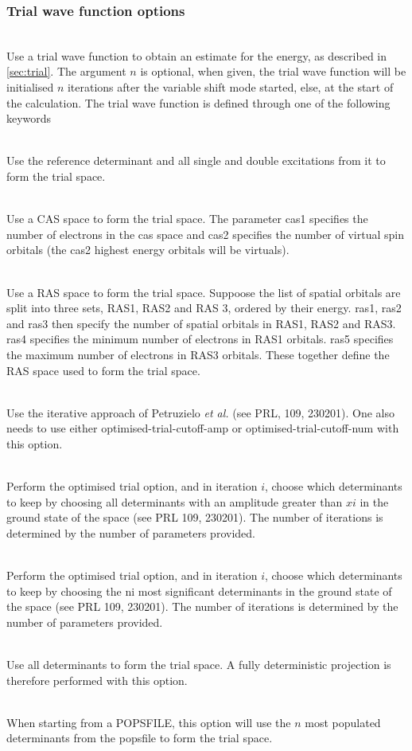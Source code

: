 \documentclass[a4paper,notitlepage]{scrreprt}
\newcommand\codeitem[1]{\needspace{1.5\baselineskip}\item[\textnormal{\ttfamily #1 \nopagebreak}] \hfill \\ \nopagebreak}
\begin{document}
  \subsubsection{Trial wave function options}
  \begin{description}
    \codeitem{trial-wavefunction $n$}
    Use a trial wave function to obtain an estimate for the energy, as
    described in \ref{sec:trial}. The argument $n$ is optional, when given,
    the trial wave function will be initialised $n$ iterations after the
    variable shift mode started, else, at the start of the calculation. The
    trial wave function is defined through one of the following keywords
    \begin{description}
    \codeitem{doubles-trial}
    Use the reference determinant and all single and double excitations
    from it to form the trial space.
    \codeitem{cas-trial cas1 cas2}
    Use a CAS space to form the trial space. The parameter cas1 specifies
    the number of electrons in the cas space and cas2 specifies the
    number of virtual spin orbitals (the cas2 highest energy orbitals
    will be virtuals).
    \codeitem{ras-trial ras1 ras2 ras3 ras4 ras5}
    Use a RAS space to form the trial space. Suppoose the list of spatial
    orbitals are split into three sets, RAS1, RAS2 and RAS 3, ordered
    by their energy. ras1, ras2 and ras3 then specify the number of
    spatial orbitals in RAS1, RAS2 and RAS3. ras4 specifies the minimum
    number of electrons in RAS1 orbitals. ras5 specifies the maximum
    number of electrons in RAS3 orbitals. These together define the RAS
    space used to form the trial space.
    \codeitem{optimised-trial}
    Use the iterative approach of Petruzielo \emph{et al.} (see PRL,
    109, 230201). One also needs to use either optimised-trial-cutoff-amp
    or optimised-trial-cutoff-num with this option.
    \codeitem{optimised-trial-cutoff-amp $x1$, $x2$, $x3$...}
    Perform the optimised trial option, and in iteration $i$, choose
    which determinants to keep by choosing all determinants with an
    amplitude greater than $xi$ in the ground state of the space (see
    PRL 109, 230201). The number of iterations is determined by the
    number of parameters provided.
    \codeitem{optimised-trial-cutoff-num $n1$, $n2$, $n3$...}
    Perform the optimised trial option, and in iteration $i$, choose
    which determinants to keep by choosing the ni most significant
    determinants in the ground state of the space (see PRL 109, 230201).
    The number of iterations is determined by the number of parameters
    provided.
    \codeitem{fci-trial}
    Use all determinants to form the trial space. A fully deterministic
    projection is therefore performed with this option.
    \codeitem{pops-trial $n$}
    When starting from a POPSFILE, this option will use the $n$ most
    populated determinants from the popsfile to form the trial space.
    \end{description}
  \end{description}
\end{document}
